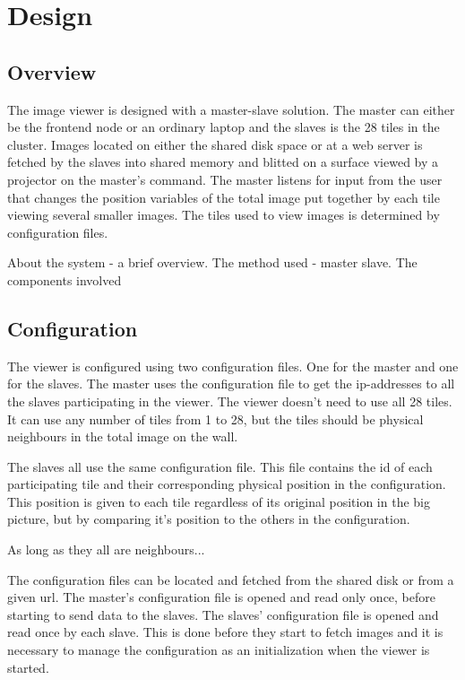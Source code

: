 \documentclass[12pt, a4paper, oneside]{article}
\begin{document}
\section{Design}
\subsection{Overview}
The image viewer is designed with a master-slave solution. The master can either be the frontend node or an ordinary laptop and the slaves is the 28 tiles in the cluster. Images located on either the shared disk space or at a web server is fetched by the slaves into shared memory and blitted on a surface viewed by a projector on the master's command. The master listens for input from the user that changes the position variables of the total image put together by each tile viewing several smaller images. The tiles used to view images is determined by configuration files.

About the system -  a brief overview. The method used - master slave. The components involved

\subsection{Configuration}
The viewer is configured using two configuration files. One for the master and one for the slaves. The master uses the configuration file to get the ip-addresses to all the slaves participating in the viewer. The viewer doesn't need to use all 28 tiles. It can use any number of tiles from 1 to 28, but the tiles should be physical neighbours in the total image on the wall. 

The slaves all use the same configuration file. This file contains the id of each participating tile and their corresponding physical position in the configuration. This position is given to each tile regardless of its original position in the big picture, but by comparing it's position to the others in the configuration. 

As long as they all are neighbours...

The configuration files can be located and fetched from the shared disk or from a given url. The master's configuration file is opened and read only once, before starting to send data to the slaves. The slaves' configuration file is opened and read once by each slave. This is done before they start to fetch images and it is necessary to manage the configuration as an initialization when the viewer is started.
\end{document}
